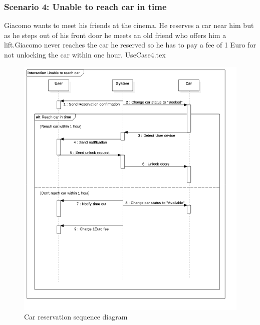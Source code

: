\documentclass[12pt]{article}
\begin{document}
		\subsubsection{Scenario 4: Unable to reach car in time}
		Giacomo wants to meet his friends at the cinema. He reserves a car near him but as he 
		steps out of his front door he meets an old friend who offers him a lift.Giacomo
		never reaches the car he reserved so he has to pay a fee of 1 Euro for not unlocking
		the car within one hour.
		\FloatBarrier
		{UseCase4.tex}
		\newpage
		\begin{figure}[htbp]
		 \caption{Car reservation sequence diagram}
		\includegraphics[scale=0.49]{Images/SequenceDiagram/Unable.png}
 	 	\end{figure}
 	 	\clearpage
		
\end{document}
